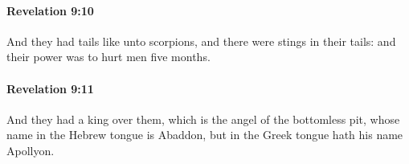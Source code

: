 		\paragraph{Revelation 9:10} %
			\label{REVELATIONNT-9-10}

			And they had tails like unto scorpions, and there were stings in their tails: and their power was to hurt men five months.

			\begin{framed}
			\scriptsize
				\begin{compactdesc}
					\item[SBLG] 
				\end{compactdesc}
			\end{framed}

		\paragraph{Revelation 9:11} %
			\label{REVELATIONNT-9-11}

			And they had a king over them, which is the angel of the bottomless pit, whose name in the Hebrew tongue is Abaddon, but in the Greek tongue hath his name Apollyon.

